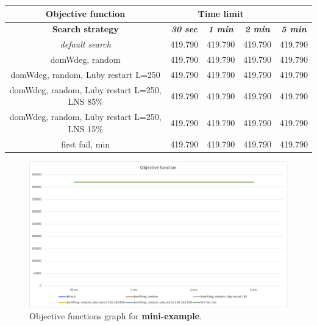 {
\renewcommand{\arraystretch}{2}
\begin{longtable}[h]{| c | c | c | c | c |}
    \hline
    \textbf{Objective function} & \multicolumn{3}{c}{Time limit} & \\
    \hline
    \textbf{Search strategy} & \textbf{\textit{30 sec}} & \textbf{\textit{1 min}} & \textbf{\textit{2 min}} & \textbf{\textit{5 min}} \\
    \hline
    \endhead
    \textit{default search}                       & 419.790 & 419.790 & 419.790 & 419.790 \\
    \hline
    domWdeg, random                               & 419.790 & 419.790 & 419.790 & 419.790 \\
    \hline
    domWdeg, random, Luby restart L=250           & 419.790 & 419.790 & 419.790 & 419.790 \\
    \hline
    domWdeg, random, Luby restart L=250, LNS 85\% & 419.790 & 419.790 & 419.790 & 419.790 \\
    \hline
    domWdeg, random, Luby restart L=250, LNS 15\% & 419.790 & 419.790 & 419.790 & 419.790 \\
    \hline
    first fail, min                               & 419.790 & 419.790 & 419.790 & 419.790 \\
    \hline
\end{longtable}
}

\begin{figure}[H]
    \centering
    \includegraphics[width=0.8\columnwidth]{../graphs/mini-example-objf.png}
    \caption{Objective functions graph for \textbf{mini-example}.}
\end{figure}

